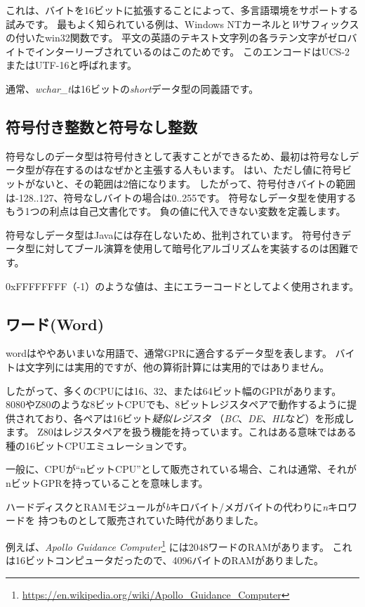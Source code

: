 これは、バイトを16ビットに拡張することによって、多言語環境をサポートする試みです。
最もよく知られている例は、Windows NTカーネルと\emph{W}サフィックスの付いたwin32関数です。
平文の英語のテキスト文字列の各ラテン文字がゼロバイトでインターリーブされているのはこのためです。
このエンコードはUCS-2またはUTF-16と呼ばれます。

通常、\emph{wchar\_t}は16ビットの\emph{short}データ型の同義語です。

\subsection{符号付き整数と符号なし整数}

符号なしのデータ型は符号付きとして表すことができるため、最初は符号なしデータ型が存在するのはなぜかと主張する人もいます。
はい、ただし値に符号ビットがないと、その範囲は2倍になります。
したがって、符号付きバイトの範囲は-128..127、符号なしバイトの場合は0..255です。
符号なしデータ型を使用するもう1つの利点は自己文書化です。
負の値に代入できない変数を定義します。

符号なしデータ型はJavaには存在しないため、批判されています。
符号付きデータ型に対してブール演算を使用して暗号化アルゴリズムを実装するのは困難です。

0xFFFFFFFF（-1）のような値は、主にエラーコードとしてよく使用されます。

\subsection{ワード(Word)}

\Gls{word}はややあいまいな用語で、通常\ac{GPR}に適合するデータ型を表します。
バイトは文字列には実用的ですが、他の算術計算には実用的ではありません。

したがって、多くの\ac{CPU}には16、32、または64ビット幅の\ac{GPR}があります。 
8080やZ80のような8ビットCPUでも、8ビットレジスタペアで動作するように提供されており、各ペアは16ビット\emph{疑似レジスタ}
（\emph{BC}、\emph{DE}、\emph{HL}など）を形成します。 
Z80はレジスタペアを扱う機能を持っています。これはある意味ではある種の16ビットCPUエミュレーションです。

一般に、CPUが``nビットCPU''として販売されている場合、これは通常、それがnビット\ac{GPR}を持っていることを意味します。

ハードディスクと\ac{RAM}モジュールが\emph{b}キロバイト/メガバイトの代わりに\emph{n}キロワードを
持つものとして販売されていた時代がありました。

例えば、\emph{Apollo Guidance Computer}\footnote{\url{https://en.wikipedia.org/wiki/Apollo_Guidance_Computer}}
には2048ワードの\ac{RAM}があります。
これは16ビットコンピュータだったので、4096バイトの\ac{RAM}がありました。

